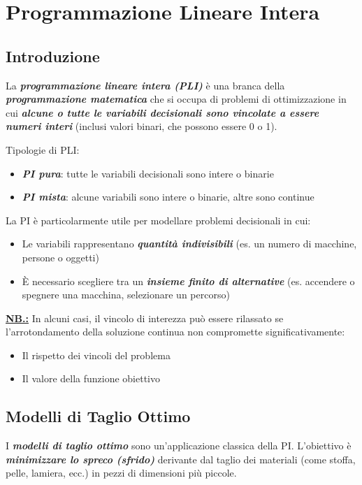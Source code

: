 \chapter{Programmazione Lineare Intera}

\section{Introduzione}
La \textbf{\textit{programmazione lineare intera (PLI)}} è una branca della \textbf{\textit{programmazione matematica}} che si occupa di problemi di ottimizzazione in cui 
\textbf{\textit{alcune o tutte le variabili decisionali sono vincolate a essere numeri interi}} (inclusi valori binari, che possono essere 0 o 1).

Tipologie di PLI:
\begin{itemize}
    \item \textbf{\textit{PI pura}}: tutte le variabili decisionali sono intere o binarie
    \item \textbf{\textit{PI mista}}: alcune variabili sono intere o binarie, altre sono continue
\end{itemize}

La PI è particolarmente utile per modellare problemi decisionali in cui:
\begin{itemize}
    \item Le variabili rappresentano \textbf{\textit{quantità indivisibili}} (es. un numero di macchine, persone o oggetti)
    \item È necessario scegliere tra un \textbf{\textit{insieme finito di alternative}} (es. accendere o spegnere una macchina, selezionare un percorso)
\end{itemize}

\underline{\textbf{NB.:}} In alcuni casi, il vincolo di interezza può essere rilassato se 
l'arrotondamento della soluzione continua non compromette significativamente:
\begin{itemize}
    \item Il rispetto dei vincoli del problema
    \item Il valore della funzione obiettivo
\end{itemize}

\section{Modelli di Taglio Ottimo}
I \textbf{\textit{modelli di taglio ottimo}} sono un'applicazione classica della PI. 
L'obiettivo è \textbf{\textit{minimizzare lo spreco (sfrido)}} derivante dal taglio dei 
materiali (come stoffa, pelle, lamiera, ecc.) in pezzi di dimensioni più piccole.


